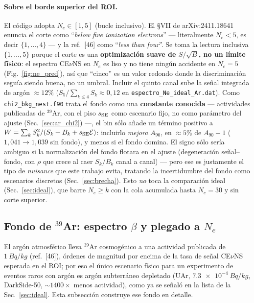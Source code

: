 \documentclass[11pt,a4paper]{article}
\newcommand{\Ne}{N_{e}}
\newcommand{\code}[1]{\texttt{#1}}
\begin{document}
\paragraph{Sobre el borde superior del ROI.} El c\'odigo adopta $\Ne\in[1,5]$
(bucle inclusivo). El \S VII de arXiv:2411.18641 enuncia el corte como
``\emph{below five ionization electrons}'' --- literalmente $\Ne<5$, es decir
$\{1,\ldots,4\}$ --- y la ref.\ [46] como ``\emph{less than four}''. Se toma la
lectura inclusiva $\{1,\ldots,5\}$ porque el corte es una \textbf{optimizaci\'on
suave de $S/\sqrt{B}$, no un l\'imite f\'isico}: el espectro CE$\nu$NS en $\Ne$
es liso y no tiene ning\'un accidente en $\Ne=5$ (Fig.~\ref{fig:ne_pred}), as\'i
que ``cinco'' es un valor redondo donde la discriminaci\'on segu\'ia siendo
buena, no un umbral. Incluir el quinto canal sube la se\~nal integrada de
arg\'on $\approx12\%$ ($S_{5}/\!\sum_{k\le4}S_{k}\approx0{,}12$ en
\code{espectro\_Ne\_ideal\_Ar.dat}). Como \code{chi2\_bkg\_nest.f90} trata el
fondo como una \textbf{constante conocida} --- actividades publicadas de
$^{39}$Ar, con el piso $s_{\rm SE}$ como escenario fijo, no como par\'ametro del
ajuste (Sec.~\ref{sec:ar_chi2}) ---, el bin s\'olo a\~nade un t\'ermino positivo
a $W=\sum_{k}S_{k}^{2}/(S_{k}+B_{k}+s_{\rm SE}\mathcal{E})$: incluirlo
\emph{mejora} $A_{90}$, en $\approx5\%$ de $A_{90}-1$
($1{,}041\to1{,}039$ sin fondo), y menos si el fondo domina. El signo s\'olo
ser\'ia ambiguo si la normalizaci\'on del fondo flotara en el ajuste
(degeneraci\'on se\~nal--fondo, con $\rho$ que crece al caer $S_{k}/B_{k}$ canal
a canal) --- pero ese es justamente el tipo de \emph{nuisance} que este trabajo
evita, tratando la incertidumbre del fondo como escenarios discretos
(Sec.~\ref{sec:brecha}). Esto \emph{no} toca la comparaci\'on ideal
(Sec.~\ref{sec:ideal}), que barre $\Ne\ge k$ con la cola acumulada hasta
$\Ne=30$ y sin corte superior.

\subsection{Fondo de $^{39}$Ar: espectro $\beta$ y plegado a $\Ne$}
\label{sec:ar39}

El arg\'on atmosf\'erico lleva $^{39}$Ar cosmog\'enico a una actividad publicada
de $\SI{1}{Bq/kg}$ (ref.~[46]), \'ordenes de magnitud por encima de la tasa de
se\~nal CE$\nu$NS esperada en el ROI; por eso el \'unico escenario f\'isico para
un experimento de eventos raros con arg\'on es arg\'on subterr\'aneo depletado
(UAr, $\SI{7.3e-4}{Bq/kg}$, DarkSide-50, $\sim\!1400\times$ menos actividad),
como ya se se\~nal\'o en la lista de la Sec.~\ref{sec:ideal}. Esta subsecci\'on
construye ese fondo en detalle.
\end{document}

